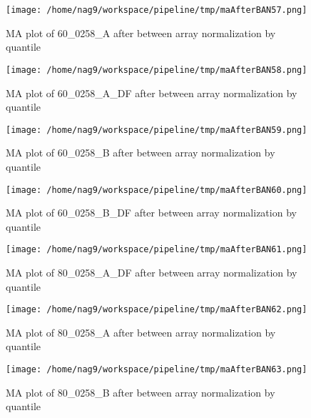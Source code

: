 \documentclass[titlepage]{article}
\begin{document}
\begin{figure}[htb!]
\centering
\texttt{[image: /home/nag9/workspace/pipeline/tmp/maAfterBAN57.png]}
\caption{MA plot of 60\_0258\_A after between array normalization by quantile}
\end{figure}\pagebreak
\begin{figure}[htb!]
\centering
\texttt{[image: /home/nag9/workspace/pipeline/tmp/maAfterBAN58.png]}
\caption{MA plot of 60\_0258\_A\_DF after between array normalization by quantile}
\end{figure}\pagebreak
\begin{figure}[htb!]
\centering
\texttt{[image: /home/nag9/workspace/pipeline/tmp/maAfterBAN59.png]}
\caption{MA plot of 60\_0258\_B after between array normalization by quantile}
\end{figure}\pagebreak
\begin{figure}[htb!]
\centering
\texttt{[image: /home/nag9/workspace/pipeline/tmp/maAfterBAN60.png]}
\caption{MA plot of 60\_0258\_B\_DF after between array normalization by quantile}
\end{figure}\pagebreak
\begin{figure}[htb!]
\centering
\texttt{[image: /home/nag9/workspace/pipeline/tmp/maAfterBAN61.png]}
\caption{MA plot of 80\_0258\_A\_DF after between array normalization by quantile}
\end{figure}\pagebreak
\begin{figure}[htb!]
\centering
\texttt{[image: /home/nag9/workspace/pipeline/tmp/maAfterBAN62.png]}
\caption{MA plot of 80\_0258\_A after between array normalization by quantile}
\end{figure}\pagebreak
\begin{figure}[htb!]
\centering
\texttt{[image: /home/nag9/workspace/pipeline/tmp/maAfterBAN63.png]}
\caption{MA plot of 80\_0258\_B after between array normalization by quantile}
\end{figure}\pagebreak
\end{document}
